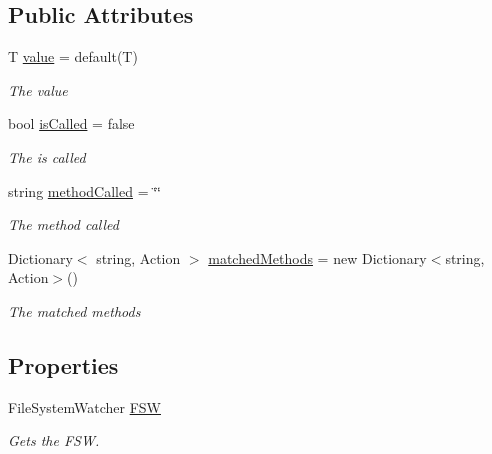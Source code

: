 \subsection*{Public Attributes}
\begin{DoxyCompactItemize}
\item 
T \hyperlink{class_lerp2_a_p_i_editor_1_1_utility_1_1_lerped_thread_a65717e0bcfeb29e6ef7e8329e658d61a}{value} = default(T)
\begin{DoxyCompactList}\small\item\em The value \end{DoxyCompactList}\item 
bool \hyperlink{class_lerp2_a_p_i_editor_1_1_utility_1_1_lerped_thread_a50fa4a6ab93d0e833943f446d5e22bb2}{is\+Called} = false
\begin{DoxyCompactList}\small\item\em The is called \end{DoxyCompactList}\item 
string \hyperlink{class_lerp2_a_p_i_editor_1_1_utility_1_1_lerped_thread_a9d52b6fa07d8175811ba4df8eb9858ad}{method\+Called} = \char`\"{}\char`\"{}
\begin{DoxyCompactList}\small\item\em The method called \end{DoxyCompactList}\item 
Dictionary$<$ string, Action $>$ \hyperlink{class_lerp2_a_p_i_editor_1_1_utility_1_1_lerped_thread_a98622930c790858b78f8a7b3f6e47da1}{matched\+Methods} = new Dictionary$<$string, Action$>$()
\begin{DoxyCompactList}\small\item\em The matched methods \end{DoxyCompactList}\end{DoxyCompactItemize}
\subsection*{Properties}
\begin{DoxyCompactItemize}
\item 
File\+System\+Watcher \hyperlink{class_lerp2_a_p_i_editor_1_1_utility_1_1_lerped_thread_a65c8afd672d7f9fcc79b6c212d1fc590}{F\+SW}
\begin{DoxyCompactList}\small\item\em Gets the F\+SW. \end{DoxyCompactList}\end{DoxyCompactItemize}


